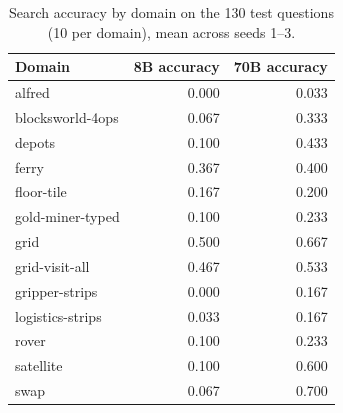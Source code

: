 \begin{table}[ht]
\centering
\caption{Search accuracy by domain on the 130 test questions (10 per domain), mean across seeds 1--3.}
\label{tab:domains}
\begin{tabular}{lrr}
\toprule
Domain & 8B accuracy & 70B accuracy \\
\midrule
alfred & 0.000 & 0.033 \\
blocksworld-4ops & 0.067 & 0.333 \\
depots & 0.100 & 0.433 \\
ferry & 0.367 & 0.400 \\
floor-tile & 0.167 & 0.200 \\
gold-miner-typed & 0.100 & 0.233 \\
grid & 0.500 & 0.667 \\
grid-visit-all & 0.467 & 0.533 \\
gripper-strips & 0.000 & 0.167 \\
logistics-strips & 0.033 & 0.167 \\
rover & 0.100 & 0.233 \\
satellite & 0.100 & 0.600 \\
swap & 0.067 & 0.700 \\
\bottomrule
\end{tabular}
\end{table}